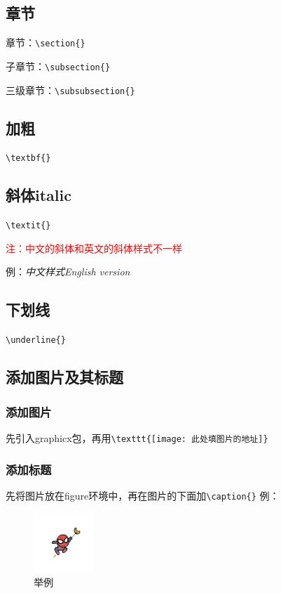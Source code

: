 \documentclass[UTF8,a4paper]{ctexart}
\begin{document}
\subsection{章节}
章节：\verb|\section{}|

子章节：\verb|\subsection{}|

三级章节：\verb|\subsubsection{}|

\subsection{加粗}\verb|\textbf{}|
\subsection{斜体italic}
\verb|\textit{}|  
 
\textcolor{red}{注：中文的斜体和英文的斜体样式不一样}

例：\textit{中文样式}\qquad\textit{English version}

\subsection{下划线}\verb|\underline{}|

\subsection{添加图片及其标题} 
\subsubsection{添加图片} 
先引入graphicx包，再用\verb|\texttt{[image: 此处填图片的地址]}| 
\subsubsection{添加标题} 
先将图片放在figure环境中，再在图片的下面加\verb|\caption{}|
例：

\begin{figure}[H]
    \centering
    \includegraphics[width=0.2\textwidth]{photo.jpg}
    \caption{举例}
\end{figure}
\end{document}

